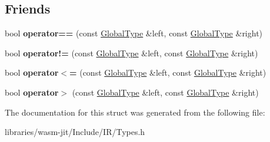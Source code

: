\subsection*{Friends}
\begin{DoxyCompactItemize}
\item 
\mbox{\label{struct_i_r_1_1_global_type_a7006d534b94fba6d03ecd2062b21de67}} 
bool {\bfseries operator==} (const \mbox{\hyperlink{struct_i_r_1_1_global_type}{Global\+Type}} \&left, const \mbox{\hyperlink{struct_i_r_1_1_global_type}{Global\+Type}} \&right)
\item 
\mbox{\label{struct_i_r_1_1_global_type_a9a669add6ce90ff1cdb7a0154b1eadb2}} 
bool {\bfseries operator!=} (const \mbox{\hyperlink{struct_i_r_1_1_global_type}{Global\+Type}} \&left, const \mbox{\hyperlink{struct_i_r_1_1_global_type}{Global\+Type}} \&right)
\item 
\mbox{\label{struct_i_r_1_1_global_type_a8d376bbc9253cf9f2d77dffd643a8584}} 
bool {\bfseries operator$<$=} (const \mbox{\hyperlink{struct_i_r_1_1_global_type}{Global\+Type}} \&left, const \mbox{\hyperlink{struct_i_r_1_1_global_type}{Global\+Type}} \&right)
\item 
\mbox{\label{struct_i_r_1_1_global_type_aa7b03b68b23eaee6038ea292ea42399c}} 
bool {\bfseries operator$>$} (const \mbox{\hyperlink{struct_i_r_1_1_global_type}{Global\+Type}} \&left, const \mbox{\hyperlink{struct_i_r_1_1_global_type}{Global\+Type}} \&right)
\end{DoxyCompactItemize}


The documentation for this struct was generated from the following file\+:\begin{DoxyCompactItemize}
\item 
libraries/wasm-\/jit/\+Include/\+I\+R/Types.\+h\end{DoxyCompactItemize}
